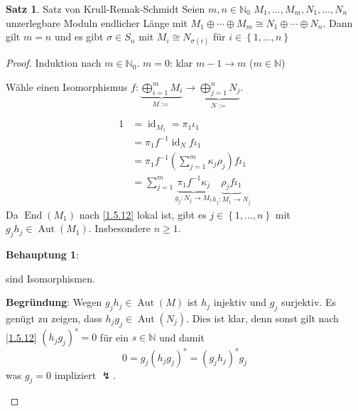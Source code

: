 \documentclass[
twoside=semi,
fontsize=12,
DIV=12, 
cleardoublepage=current,
leqno,
headings=optiontoheadandtoc, 
toc=idx
]{scrbook}
\newcommand{\N}{\mathbb{N}}
\newcommand{\brac}[1]{\left( #1 \right)}
\newcommand{\set}[1]{\left\{ #1 \right\}}
\DeclareMathOperator{\id}{id}
\DeclareMathOperator{\End}{End}
\DeclareMathOperator{\Aut}{Aut}
\theoremstyle{definition}
\newtheorem{satz}[definition]{Satz}
\begin{document}
	\begin{satz}\label{1.5.13} Satz von Krull-Remak-Schmidt\newline
		Seien $m, n\in \N_0$ $M_1, \dots, M_m, N_1, \dots, N_n$ unzerlegbare Moduln endlicher L\"ange mit \linebreak $M_1 \oplus \cdots \oplus M_m \cong N_1 \oplus \cdots \oplus N_n$. Dann gilt $m=n$ und es gibt 
		$\sigma \in S_n$ mit $M_i \cong N_{\sigma(i)}$ f\"ur $i \in \set{1, \dots, n}$
		
		\begin{proof}
			Induktion nach $m \in \N_0$. $m = 0$: klar\newline
			$m-1 \to m$ ($m \in \N$)
			
			W\"ahle einen Isomorphismus $f: \underbrace{\bigoplus_{i=1}^m M_i}_{M:=}\to \underbrace{\bigoplus_{j=1}^n N_j}_{N:=}$.
			\begin{center}
			\end{center}	
			\begin{align*}
				1 &= \id_{M_1}  = \pi_1\iota_1\\
				&= \pi_1f^{-1}\id_Nf\iota_1\\
				&= \pi_1f^{-1}\brac{\sum_{j=1}^m \kappa_j\rho_j}f\iota_1\\
				&= \sum_{j=1}^m\underbrace{\pi_1f^{-1}\kappa_j}_{g_j:N_j \to M_1}\underbrace{\rho_jf\iota_1}_{h_j:M_1 \to N_j}
			\end{align*}
			Da $\End(M_1)$ nach \ref{1.5.12} lokal ist, gibt es $j \in \set{1, \dots, n}$ mit $g_jh_j \in \Aut(M_1)$. Insbesondere $n \geq 1$.
			
			\begin{tcolorbox}[colback=white,colframe=blue,arc=0cm]
				\textbf{Behauptung 1}:  sind Isomorphismen.
				
				\tcblower
				\textbf{Begr\"undung}: Wegen $g_jh_j \in \Aut(M)$ ist $h_j$ injektiv und $g_j$ surjektiv. Es gen\"ugt zu zeigen, dass $h_jg_j \in \Aut(N_j)$. Dies ist klar, denn sonst gilt nach \ref{1.5.12} $(h_jg_j)^s = 0$ f\"ur ein $s \in \N$ und damit 
				\[0 = g_j(h_jg_j)^s = (g_jh_j)^sg_j\]
				was $g_j = 0$ impliziert $\lightning$.
			\end{tcolorbox}
			

\end{proof}
\end{satz}
\end{document}
